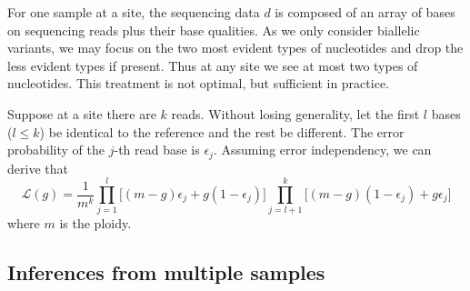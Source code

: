 \documentclass{bioinfo}
\begin{document}
\begin{methods}
For one sample at a site, the sequencing data $d$ is composed of an array of
bases on sequencing reads plus their base qualities. As we only consider
biallelic variants, we may focus on the two most evident types of nucleotides
and drop the less evident types if present. Thus at any site we see at most two
types of nucleotides. This treatment is not optimal, but sufficient in
practice.

Suppose at a site there are $k$ reads. Without losing generality, let the first
$l$ bases ($l\le k$) be identical to the reference and the rest be different.
The error probability of the $j$-th read base is $\epsilon_j$.  Assuming error
independency, we can derive that
\begin{equation}\label{equ:glk}
\mathcal{L}(g)=\frac{1}{m^k}\prod_{j=1}^l\Big[(m-g)\epsilon_j+g(1-\epsilon_j)\Big]\prod_{j=l+1}^k\Big[(m-g)(1-\epsilon_j)+g\epsilon_j\Big]
\end{equation}
where $m$ is the ploidy.


\subsection{Inferences from multiple samples}


\end{methods}
\end{document}
